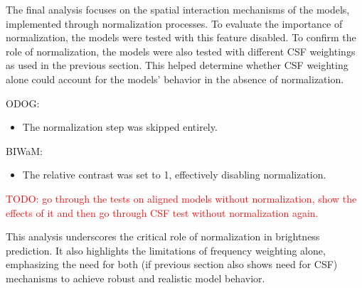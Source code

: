 The final analysis focuses on the spatial interaction mechanisms of the models,
implemented through normalization processes. To evaluate the importance of normalization,
the models were tested with this feature disabled. To confirm the role of normalization,
the models were also tested with different CSF weightings as used in the previous section.
This helped determine whether CSF weighting alone could account for the models’ behavior
in the absence of normalization.

ODOG:
\begin{itemize} 
    \item The normalization step was skipped entirely.
\end{itemize}
BIWaM:
\begin{itemize} 
    \item The relative contrast was set to 1, effectively disabling normalization.
\end{itemize}

\textcolor{red}{TODO: go through the tests on aligned models without normalization, show
the effects of it and then go through CSF test without normalization again.}

This analysis underscores the critical role of normalization in brightness prediction. It
also highlights the limitations of frequency weighting alone, emphasizing the need for
both (if previous section also shows need for CSF) mechanisms to achieve robust and
realistic model behavior.






